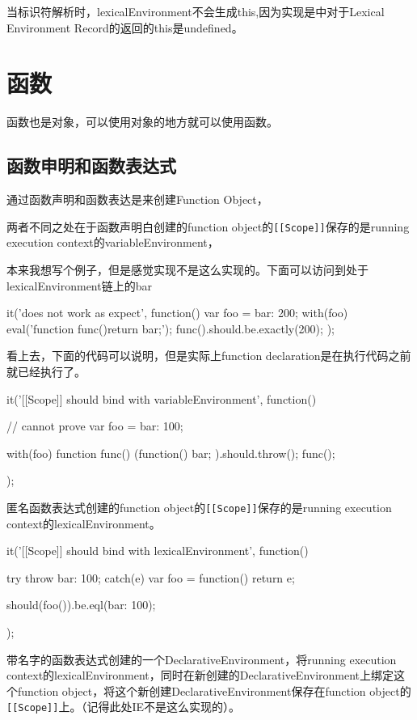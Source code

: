 当标识符解析时，lexicalEnvironment不会生成this,因为实现是中对于Lexical Environment Record的返回的this是undefined。

\section{函数}
函数也是对象，可以使用对象的地方就可以使用函数。

\subsection{函数申明和函数表达式}	
通过函数声明和函数表达是来创建Function Object，

两者不同之处在于函数声明白创建的function object的\lstinline![[Scope]]!保存的是running execution context的variableEnvironment，

本来我想写个例子，但是感觉实现不是这么实现的。下面可以访问到处于lexicalEnvironment链上的bar
\begin{JavaScript}
		it('does not work as expect', function(){
			var foo = {bar: 200};
			with(foo) {
				eval('function func(){return bar;}');
			}
			func().should.be.exactly(200);
		});
\end{JavaScript}
看上去，下面的代码可以说明，但是实际上function declaration是在执行代码之前就已经执行了。
\begin{JavaScript}
		it('[[Scope]] should bind with variableEnvironment', function(){
			// cannot prove
			var foo = {bar: 100};

			with(foo) {
				function func() {
					(function(){
						bar;
					}).should.throw();
				}
			}
			func();
		});
\end{JavaScript}

匿名函数表达式创建的function object的\lstinline![[Scope]]!保存的是running execution context的lexicalEnvironment。
\begin{JavaScript}
		it('[[Scope]] should bind with lexicalEnvironment', function(){

			try {
				throw {bar: 100};
			} catch(e) {
				var foo = function(){
					return e;
				}
			}

			should(foo()).be.eql({bar: 100});
		});
\end{JavaScript}

带名字的函数表达式创建的一个DeclarativeEnvironment，将running execution context的lexicalEnvironment，同时在新创建的DeclarativeEnvironment上绑定这个function object，将这个新创建DeclarativeEnvironment保存在function object的\lstinline![[Scope]]!上。（记得此处IE不是这么实现的）。

